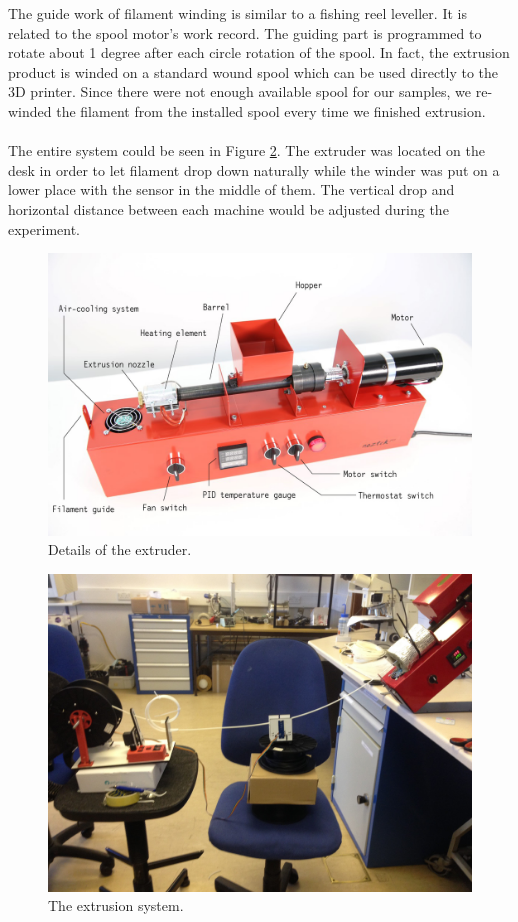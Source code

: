 The guide work of filament winding is similar to a fishing reel leveller. It is related to the spool motor's work record. The guiding part is programmed to rotate about 1 degree after each circle rotation of the spool. In fact, the extrusion product is winded on a standard wound spool which can be used directly to the 3D printer. Since there were not enough available spool for our samples, we re-winded the filament from the installed spool every time we finished extrusion.\\
\\
The entire system could be seen in Figure \ref{Fig:system}. The extruder was located on the desk in order to let filament drop down naturally while the winder was put on a lower place with the sensor in the middle of them. The vertical drop and horizontal distance between each machine would be adjusted during the experiment.

\begin{figure}[htbp]
  \centering
  \includegraphics[scale=0.3]{Figs3//Noztekexplained.jpg}
  \caption[Details of the extruder]{\footnotesize Details of the extruder.}
  \label{Fig:extruderexp}
\end{figure}
\begin{figure}[htbp]
  \centering
  \includegraphics[scale=0.1]{Figs3//system.jpg}
  \caption[The extrusion system]{\footnotesize The extrusion system.}
  \label{Fig:system}
\end{figure}

